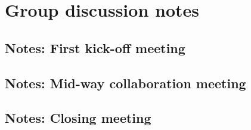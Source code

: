 \chapter{Group discussion notes}

\section*{Notes: First kick-off meeting}

\section*{Notes: Mid-way collaboration meeting}

\section*{Notes: Closing meeting}
